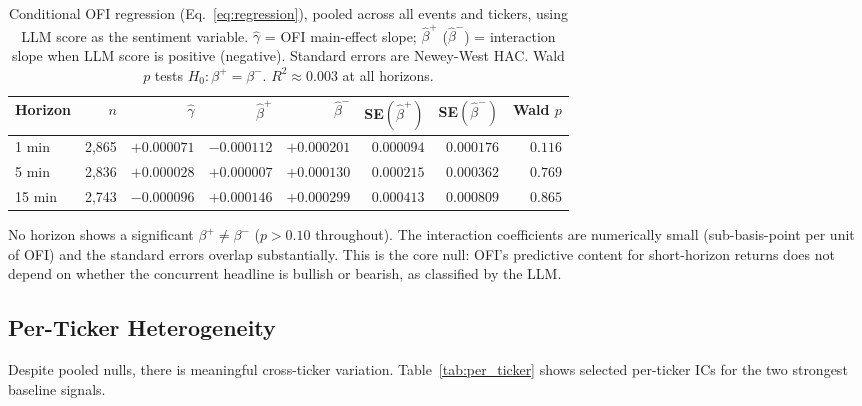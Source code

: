 \documentclass[11pt, letterpaper]{article}
\begin{document}
\begin{table}[h]
\centering
\small
\caption{Conditional OFI regression (Eq.~\ref{eq:regression}), pooled across all
events and tickers, using LLM score as the sentiment variable. $\hat{\gamma}$ =
OFI main-effect slope; $\hat{\beta}^+$ ($\hat{\beta}^-$) = interaction slope when
LLM score is positive (negative). Standard errors are Newey-West HAC.
Wald $p$ tests $H_0\!: \beta^+ = \beta^-$. $R^2 \approx 0.003$ at all horizons.}
\label{tab:regression}
\begin{tabular}{lrrrrrrr}
\toprule
Horizon & $n$ & $\hat{\gamma}$ & $\hat{\beta}^+$ & $\hat{\beta}^-$
        & SE$(\hat{\beta}^+)$ & SE$(\hat{\beta}^-)$ & Wald $p$ \\
\midrule
1 min  & 2,865 & $+0.000071$ & $-0.000112$ & $+0.000201$ & $0.000094$ & $0.000176$ & $0.116$ \\
5 min  & 2,836 & $+0.000028$ & $+0.000007$ & $+0.000130$ & $0.000215$ & $0.000362$ & $0.769$ \\
15 min & 2,743 & $-0.000096$ & $+0.000146$ & $+0.000299$ & $0.000413$ & $0.000809$ & $0.865$ \\
\bottomrule
\end{tabular}
\end{table}

No horizon shows a significant $\beta^+ \neq \beta^-$ ($p > 0.10$ throughout). The
interaction coefficients are numerically small (sub-basis-point per unit of OFI) and
the standard errors overlap substantially. This is the core null: OFI's predictive
content for short-horizon returns does not depend on whether the concurrent headline
is bullish or bearish, as classified by the LLM.

\subsection{Per-Ticker Heterogeneity}

Despite pooled nulls, there is meaningful cross-ticker variation. Table~\ref{tab:per_ticker}
shows selected per-ticker ICs for the two strongest baseline signals.
\end{document}
